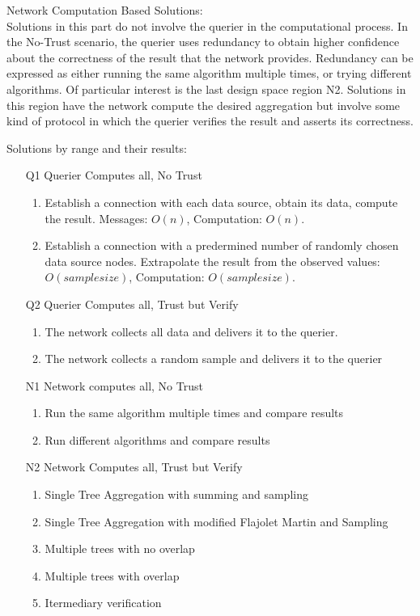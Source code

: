 \documentclass{article}
\begin{document}
Network Computation Based Solutions:\\
Solutions in this part do not involve the querier in the computational
process. In the No-Trust scenario, the querier uses redundancy to
obtain higher confidence about the correctness of the result that the
network provides. Redundancy can be expressed as either running the
same algorithm multiple times, or trying different algorithms. Of
particular interest is the last design space region N2. Solutions in
this region have the network compute the desired aggregation but
involve some kind of protocol in which the querier verifies the result
and asserts its correctness. 


Solutions by range and their results:

\begin{enumerate}
  \item [Q1] Querier Computes all, No Trust
    \begin{enumerate}
      \item Establish a connection with each data source, obtain its
      data, compute the result. Messages: $O(n)$, Computation: $O(n)$.
      
      \item Establish a connection with a predermined number of
      randomly chosen data source nodes. Extrapolate the result from
      the observed values: $O(sample size)$, Computation: $O(sample size)$.
      
    \end{enumerate}
  \item [Q2] Querier Computes all, Trust but Verify
    \begin{enumerate}
      
      \item The network collects all data and delivers it to the
      querier.

    \item The network collects a random sample and delivers it to
      the querier
    \end{enumerate}
  \item [N1] Network computes all, No Trust
    \begin{enumerate}
      \item Run the same algorithm multiple times and compare results
      \item Run different algorithms and compare results
    \end{enumerate}
  \item [N2] Network Computes all, Trust but Verify
    \begin{enumerate}
      \item Single Tree Aggregation with summing and sampling
      \item Single Tree Aggregation with modified Flajolet Martin
        and Sampling
      \item Multiple trees with no overlap
      \item Multiple trees with overlap
      \item Itermediary verification
    \end{enumerate}  
\end{enumerate}
\end{document}
